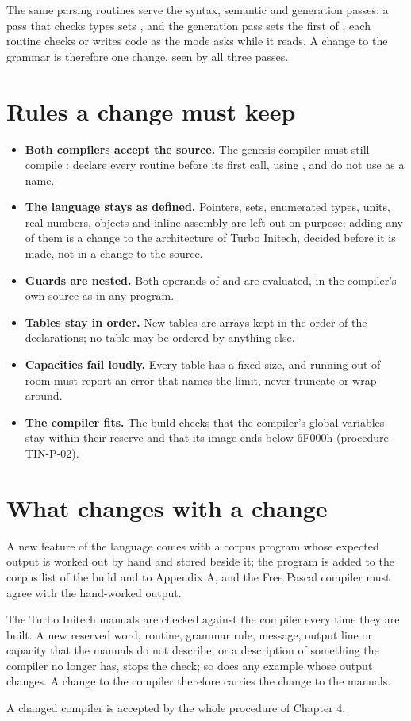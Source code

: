 The same parsing routines serve the syntax, semantic and generation
passes: a pass that checks types sets , and the generation pass
sets the first of ; each routine checks or writes code as the
mode asks while it reads.  A change to the grammar is therefore one change,
seen by all three passes.

\section{Rules a change must keep}
\begin{itemize}
\item \textbf{Both compilers accept the source.}  The genesis compiler must
  still compile : declare every routine before its first call,
  using , and do not use  as a name.
\item \textbf{The language stays as defined.}  Pointers, sets, enumerated
  types, units, real numbers, objects and inline assembly are left out on
  purpose; adding any of them is a change to the architecture of Turbo
  Initech, decided before it is made, not in a change to the source.
\item \textbf{Guards are nested.}  Both operands of  and  are
  evaluated, in the compiler's own source as in any program.
\item \textbf{Tables stay in order.}  New tables are arrays kept in the
  order of the declarations; no table may be ordered by anything else.
\item \textbf{Capacities fail loudly.}  Every table has a fixed size, and
  running out of room must report an error that names the limit, never
  truncate or wrap around.
\item \textbf{The compiler fits.}  The build checks that the compiler's
  global variables stay within their reserve and that its image ends below
  6F000h (procedure TIN-P-02).
\end{itemize}

\section{What changes with a change}
A new feature of the language comes with a corpus program
whose expected output is worked out by hand and stored beside it; the
program is added to the corpus list of the build and to Appendix A, and the
Free Pascal compiler must agree with the hand-worked output.

The Turbo Initech manuals are checked against the
compiler every time they are built.  A new reserved word, routine, grammar
rule, message, output line or capacity that the manuals do not describe,
or a description of something the compiler no longer has, stops the check;
so does any example whose output changes.  A change to the compiler
therefore carries the change to the manuals.

A changed compiler is accepted by the whole procedure
of Chapter 4.
